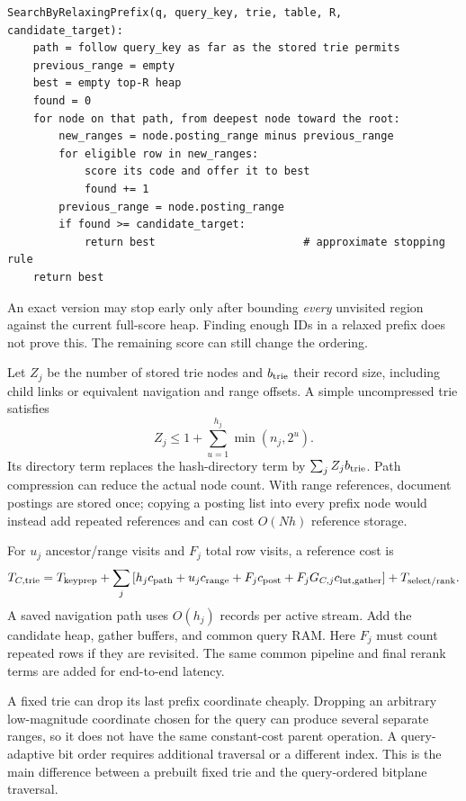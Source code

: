 \par\noindent\begin{minipage}{\linewidth}
\begin{lstlisting}[caption={A fixed-prefix relaxation variant of Approach C.}]
SearchByRelaxingPrefix(q, query_key, trie, table, R, candidate_target):
    path = follow query_key as far as the stored trie permits
    previous_range = empty
    best = empty top-R heap
    found = 0
    for node on that path, from deepest node toward the root:
        new_ranges = node.posting_range minus previous_range
        for eligible row in new_ranges:
            score its code and offer it to best
            found += 1
        previous_range = node.posting_range
        if found >= candidate_target:
            return best                       # approximate stopping rule
    return best
\end{lstlisting}
\end{minipage}\par
An exact version may stop early only after bounding \emph{every} unvisited region against the
current full-score heap. Finding enough IDs in a relaxed prefix does not prove this.
The remaining score can still change the ordering.

Let $Z_j$ be the number of stored trie nodes and $b_{\rm trie}$ their record size, including
child links or equivalent navigation and range offsets. A simple uncompressed trie satisfies
\[
Z_j\leq 1+\sum_{u=1}^{h_j}\min(n_j,2^u).
\]
Its directory term replaces the hash-directory term by $\sum_j Z_jb_{\rm trie}$. Path compression
can reduce the actual node count. With range references, document postings are stored once;
copying a posting list into every prefix node would instead add repeated references and can
cost $O(Nh)$ reference storage.

For $u_j$ ancestor/range visits and $F_j$ total row visits, a reference cost is
\begin{equation}
T_{C,\rm trie}=T_{\rm keyprep}+
\sum_j\left[h_jc_{\rm path}+u_jc_{\rm range}+F_jc_{\rm post}
 +F_jG_{C,j}c_{\rm lut,gather}\right]+T_{\rm select/rank}.
\label{eq:trie-cost}
\end{equation}
A saved navigation path uses $O(h_j)$ records per active stream. Add the candidate heap,
gather buffers, and common query RAM. Here $F_j$ must count repeated rows if they are revisited.
The same common pipeline and final rerank terms are added for end-to-end latency.

A fixed trie can drop its last prefix coordinate cheaply. Dropping an arbitrary
low-magnitude coordinate chosen for the query can produce several separate ranges, so it does not
have the same constant-cost parent operation. A query-adaptive bit order requires additional
traversal or a different index. This is the main difference between a prebuilt fixed trie and
the query-ordered bitplane traversal.

